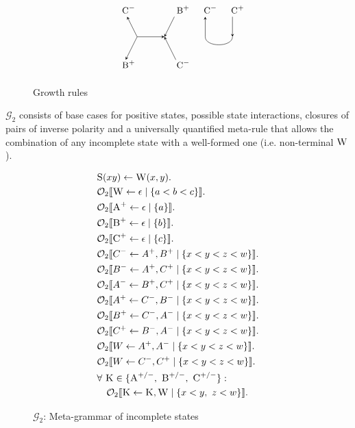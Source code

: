 \documentclass{llncs}
\newcommand\s{\textsc}
\newcommand{\Orderr}[5]{
	\mathcal{#1}_{#5}\llbracket #2 \leftarrow #3 \mid \{ #4 \} \rrbracket.
}
\newcommand{\Or}[4]{\Orderr{O}{#1}{#2}{#3}{#4}}
\begin{document}
\begin{figure}
\[\begin{tikzpicture}
\node (i33) at (7,-5) {$\textsc{\small C}^-$};
\node (ii33) at (9,-5) {$\textsc{\small B}^+$};
\node (d33) at (7.5,-6) {};
\node (dd33) at (8.5,-6) {};
\node (o33) at (7,-7) {$\textsc{\small B}^+$};
\node (oo33) at (9,-7) {$\textsc{\small C}^-$};
\draw[<-,>=stealth] (i33) -- (d33.center);
\draw[->,>=stealth] (ii33) -- (dd33.center);
\draw[->,>=stealth] (d33.center) -- (dd33.center);
\draw[->,>=stealth, shorten >=5pt] (d33.center) -- (o33.center);
\draw[<-,>=stealth, shorten >=5pt] (dd33.center) -- (oo33.center);

\node (i34) at (10,-5) {$\textsc{\small C}^-$};
\node (ii34) at (11,-5) {$\textsc{\small C}^+$};
\node (d34) at (10,-6) {};
\node (dd34) at (11,-6) {};\draw[<-,>=stealth] (i34) -- (d34.center);
\draw[->,>=stealth] (ii34) -- (dd34.center);
\draw (d34.center) edge [-,>=stealth,bend right=90] (dd34.center);

\end{tikzpicture}
\]
\caption{Growth rules}
\label{fig:rules}
\end{figure}

$\mathcal{G}_2$ consists of base cases for positive states, possible state interactions, closures of pairs of inverse polarity and a universally quantified meta-rule that allows the combination of any incomplete state with a well-formed one (i.e. non-terminal $\s{W}$).
\begin{figure}
    \centering
		\begin{align*}
		&\s{S}(xy) \leftarrow \s{W}(x,y). \\
		&\Or{\s{W}}{\epsilon}{a < b < c}{2} \\
		&\Or{\s{A}^+}{\epsilon}{a}{2} \\
		&\Or{\s{B}^+}{\epsilon}{b}{2} \\
		&\Or{\s{C}^+}{\epsilon}{c}{2} \\
		&\Or{C^-}{A^+, B^+}{x < y < z < w}{2} \\
		&\Or{B^-}{A^+, C^+}{x < y < z < w}{2} \\
		&\Or{A^-}{B^+, C^+}{x < y < z < w}{2} \\
		&\Or{A^+}{C^-, B^-}{x < y < z < w}{2} \\
		&\Or{B^+}{C^-, A^-}{x < y < z < w}{2} \\
		&\Or{C^+}{B^-, A^-}{x < y < z < w}{2} \\
		&\Or{W}{A^+, A^-}{x < y < z < w}{2} \\
		&\Or{W}{C^-, C^+}{x < y < z < w}{2} \\
		&\forall \ \s{K} \in \{\textsc{A}^{+/-},\ \textsc{B}^{+/-},\ \textsc{C}^{+/-}\}:\\ 
		&\quad\Or{\s{K}}{\s{K}, \s{W}}{x < y,\ z < w}{2}
		\end{align*}
    \caption{$\mathcal{G}_2$: Meta-grammar of incomplete states}%
    \label{fig:g2}
\end{figure}
\end{document}
